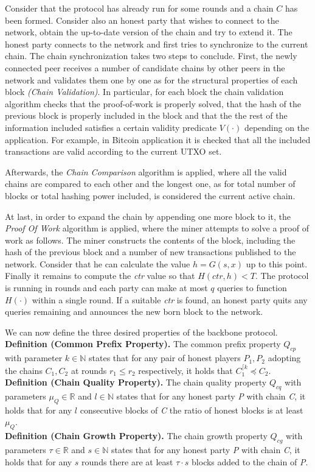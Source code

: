 \documentclass[11pt,a4paper]{article}
\begin{document}
Consider that the protocol has already run for some rounds and a chain $C$ has been formed. Consider
also an honest party that wishes to connect to the network, obtain the up-to-date version of the
chain and try to extend it.
The honest party connects to the network and first tries to synchronize to the current chain. The
chain synchronization takes two steps to conclude. First, the newly connected peer receives a number
of candidate chains by other peers in the network and validates them one by one as for the structural 
properties of each block \textit{(Chain Validation)}. In particular, for each block the chain
validation algorithm checks that the proof-of-work is properly solved, that the hash of the previous
block is properly included in the block and that the the rest of the information included satisfies
a certain validity predicate $V(\cdot)$ depending on the application. For example, in Bitcoin
application it is checked that all the included transactions are valid according to the current
UTXO set.

Afterwards, the \textit{Chain Comparison} algorithm is applied, where all the valid chains are
compared to each other and the longest one, as for total number of blocks or total hashing power
included, is considered the current active chain.

At last, in order to expand the chain by appending one more block to it, the \textit{Proof Of Work}
algorithm is applied, where the miner attempts to solve a proof of work as follows. The miner
constructs the contents of the block, including the hash of the previous block and a number of new
transactions published to the network. Consider that he can calculate the value $h = G(s,x)$ up
to this point. Finally it remains to compute the \textit{ctr} value so that $H(ctr, h) < T$. The
protocol is running in rounds and each party can make at most $q$ queries to function $H(\cdot)$
within a single round. If a suitable \textit{ctr} is found, an honest party quits any queries
remaining and announces the new born block to the network.

We can now define the three desired properties of the backbone protocol.\\
\textbf{Definition (Common Prefix Property).} The common prefix property $Q_{cp}$ with parameter
$k \in \mathbb{N}$ states that for any pair of honest players $P_1, P_2$ adopting the chains
$C_1, C_2$ at rounds $r_1 \leq r_2$ respectively, it holds that $C_1^{\lceil k} \preceq C_2$.\\
\textbf{Definition (Chain Quality Property).} The chain quality property $Q_{cq}$ with
parameters $\mu_Q \in \mathbb{R}$ and $l \in \mathbb{N}$ states that for any honest
party \textit{P} with chain \textit{C}, it holds that for any $l$ consecutive
blocks of \textit{C} the ratio of honest blocks is at least $\mu_Q$.\\
\textbf{Definition (Chain Growth Property).} The chain growth property $Q_{cg}$ with
parameters $\tau \in \mathbb{R}$ and $s \in \mathbb{N}$ states that for any honest party
\textit{P} with chain \textit{C}, it holds that for any $s$ rounds there are at least $\tau \cdot s$ blocks added to the chain of \textit{P}.
\end{document}
